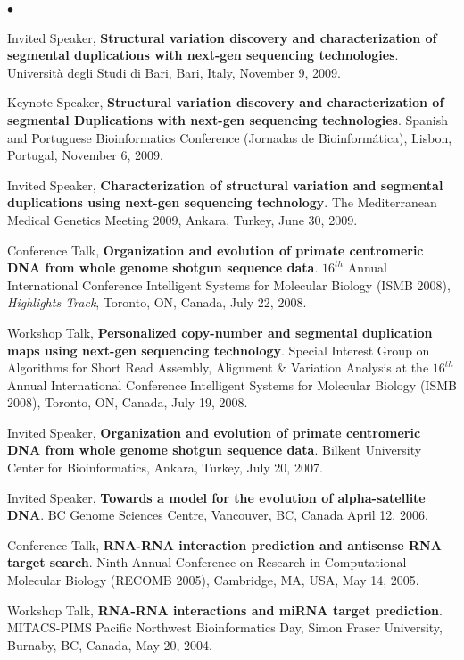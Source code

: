 \documentclass[margin,line]{res}
\newenvironment{list2}{
  \begin{list}{$\bullet$}{%
      \setlength{\itemsep}{0in}
      \setlength{\parsep}{0in} \setlength{\parskip}{0in}
      \setlength{\topsep}{0in} \setlength{\partopsep}{0in} 
      \setlength{\leftmargin}{0.2in}}}{\end{list}}
\begin{document}
\begin{resume}
\begin{list2}
\item 
  Invited Speaker, {\bf Structural variation discovery and characterization of segmental duplications with next-gen sequencing technologies}.
  Universit\`{a} degli Studi di Bari, 
  Bari, Italy, November 9, 2009.

\item 
  Keynote Speaker, {\bf Structural variation discovery and characterization of segmental Duplications with next-gen sequencing technologies}.
 Spanish and Portuguese Bioinformatics Conference (Jornadas de Bioinform\'{a}tica),
 Lisbon, Portugal, November 6, 2009.
\item 
  Invited Speaker, {\bf Characterization of structural variation and segmental duplications using next-gen sequencing technology}.
  The Mediterranean Medical Genetics Meeting 2009, Ankara, Turkey, June 30, 2009. 

\item
  Conference Talk, 
  {\bf Organization and evolution of primate centromeric DNA
from whole genome shotgun sequence data}.  $16^{th}$ Annual
International Conference Intelligent Systems for Molecular Biology (ISMB 2008), {\em Highlights Track},
Toronto, ON, Canada, July 22, 2008.

\item
  Workshop Talk, {\bf Personalized copy-number and segmental duplication maps using next-gen sequencing technology}.
Special Interest Group on Algorithms for Short Read Assembly, Alignment \& Variation Analysis at the
 $16^{th}$ Annual
International Conference Intelligent Systems for Molecular Biology (ISMB 2008),
Toronto, ON, Canada, July 19, 2008.

\item
  Invited Speaker, {\bf Organization and evolution of primate centromeric DNA
from whole genome shotgun sequence data}. Bilkent University Center for Bioinformatics,
Ankara, Turkey, July 20, 2007.

\item
  Invited Speaker, {\bf Towards a model for the evolution of alpha-satellite DNA}.
  BC Genome Sciences Centre, Vancouver, BC, Canada April 12, 2006.

\item  
  Conference Talk, {\bf RNA-RNA interaction prediction and antisense RNA target search}.
  Ninth Annual Conference on Research in Computational Molecular Biology (RECOMB 2005),
  Cambridge, MA, USA, May 14, 2005.
  
\item
 
  Workshop Talk, {\bf RNA-RNA interactions and miRNA target prediction}.
  MITACS-PIMS Pacific Northwest Bioinformatics Day, Simon Fraser University, Burnaby, BC, Canada, 
  May 20, 2004.

 
\end{list2}

\clearpage


\end{resume}
\end{document}
